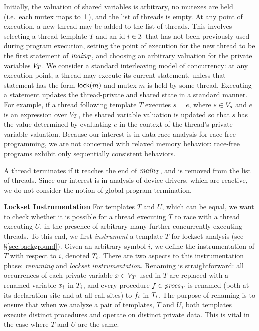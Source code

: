 Initially, the valuation of shared variables is arbitrary, no mutexes are held (i.e.\ each mutex maps to $\bot$), and the list of threads is empty.
%
At any point of execution, a new thread may be added to the list of threads.  This involves selecting a thread template $T$ and an id $i \in \mathcal{I}$ that has not been previously used during program execution, setting the point of execution for the new thread to be the first statement of $\mathit{main}_{T}$, and choosing an arbitrary valuation for the private variables $V_{T}$.
%
We consider a standard interleaving model of concurrency: at any execution point, a thread may execute its current statement, unless that statement has the form $\mathsf{lock}(m)$ and mutex $m$ is held by some thread.  Executing a statement updates the thread-private and shared state in a standard manner.  For example, if a thread following template $T$ executes $s = e$, where $s \in V_s$ and $e$ is an expression over $V_{T}$, the shared variable valuation is updated so that $s$ has the value determined by evaluating $e$ in the context of the thread's private variable valuation.  Because our interest is in data race analysis for race-free programming, we are not concerned with relaxed memory behavior: race-free programs exhibit only sequentially consistent behaviors.

A thread terminates if it reaches the end of $\mathit{main}_{T}$, and is removed from the list of threads.  Since our interest is in analysis of device drivers, which are reactive, we do not consider the notion of global program termination.

\noindent\textbf{Lockset Instrumentation }
%
For templates $T$ and $U$, which can be equal, we want to check whether it is possible for a thread executing $T$ to race with a thread executing $U$, in the presence of arbitrary many further concurrently executing threads.
%
To this end, we first \emph{instrument} a template $T$ for lockset analysis (see \S\ref{sec:background}).  Given an arbitrary symbol $i$, we define the instrumentation of $T$ with respect to $i$, denoted $T_{i}$.  There are two aspects to this instrumentation phase: \emph{renaming} and \emph{lockset instrumentation}.
%
Renaming is straightforward: all occurrences of each private variable $x \in V_{T}$ used in $T$ are replaced with a renamed variable $x_{i}$ in $T_{i}$, and every procedure $f \in \mathit{procs}_{T}$ is renamed (both at its declaration site and at all call sites) to $f_{i}$ in $T_{i}$.  The purpose of renaming is to ensure that when we analyze a pair of templates, $T$ and $U$, both templates execute distinct procedures and operate on distinct private data.  This is vital in the case where $T$ and $U$ are the same.

